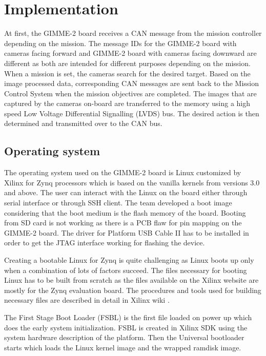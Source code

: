 \section{Implementation}\label{sec:implementation}
At first, the GIMME-2 board receives a CAN message from the mission controller depending on the mission. The message IDs for the GIMME-2 board with cameras facing forward and GIMME-2 board with cameras facing downward are different as both are intended for different purposes depending on the mission. When a mission is set, the cameras search for the desired target. Based on the image processed data, corresponding CAN messages are sent back to the Mission Control System when the mission objectives are completed. The images that are captured by the cameras on-board are transferred to the memory using a high speed Low Voltage Differential Signalling (LVDS) bus. The desired action is then determined and transmitted over to the CAN bus.

\subsection{Operating system}
The operating system used on the GIMME-2 board is Linux customized by Xilinx for Zynq processors which is based on the vanilla kernels from versions 3.0 and above. The user can interact with the Linux on the board either through serial interface or through SSH client. The team developed a boot image considering that the boot medium is the flash memory of the board. Booting from SD card is not working as there is a PCB flaw for pin mapping on the GIMME-2 board. The driver for Platform USB Cable II has to be installed in order to get the JTAG interface working for flashing the device.

Creating a bootable Linux for Zynq is quite challenging as Linux boots up only when a combination of lots of factors succeed. The files necessary for booting Linux has to be built from scratch as the files available on the Xilinx website are mostly for the Zynq evaluation board. The procedures and tools used for building necessary files are described in detail in Xilinx wiki \cite{XilinxWiki}. 

The First Stage Boot Loader (FSBL) is the first file loaded on power up which does the early system initialization. FSBL is created in Xilinx SDK using the system hardware description of the platform. Then the Universal bootloader starts which loads the Linux kernel image and the wrapped ramdisk image.

